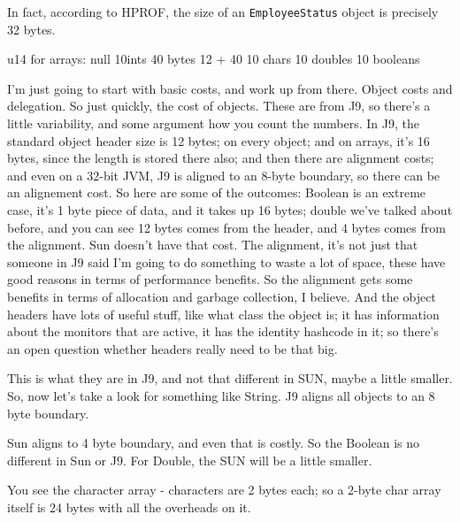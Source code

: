 \documentclass{book}
\theoremstyle{definition}
\begin{document}
In fact, according to HPROF, the size of an \texttt{EmployeeStatus} object is precisely 32 bytes.

u14  for arrays:
				null
				10ints    40 bytes  12 + 40
				10 chars
				10 doubles
				10 booleans

I'm just going to start with basic costs, and work up from there. Object costs and delegation.  So just quickly, the cost of objects. These are from J9, so there's a little variability, and some argument how you count the numbers. In J9, the standard object header size is 12 bytes; on every object; and on arrays, it's 16 bytes, since the length is stored there also; and then there are alignment costs; and even on a 32-bit JVM, J9 is aligned to an 8-byte boundary, so there can be an alignement cost. So here are some of the outcomes: Boolean is an extreme case, it's 1 byte piece of data, and it takes up 16 bytes; double we've talked about before, and you can see 12 bytes comes from the header, and 4 bytes comes from the alignment. Sun doesn't have that cost. The alignment, it's not just that someone in J9 said I'm going to do something to waste a lot of space, these have good reasons in terms of performance benefits. So the alignment gets some benefits in terms of allocation and garbage collection, I believe. And the object headers have lots of useful stuff, like what class the object is; it has information about the monitors that are active, it has the identity hashcode in it; so there's an open question whether headers really need to be that big. 

This is what they are in J9, and not that different in SUN, maybe a little smaller.  So, now let's take a look for something like String.  J9 aligns all objects to an 8 byte boundary.

Sun aligns to 4 byte boundary, and even that is costly.  So the Boolean is no different in Sun or J9. For Double, the SUN will be a little smaller.  

You see the character array - characters are 2 bytes each; so a 2-byte char array itself is 24 bytes with all the overheads on it.
\end{document}
